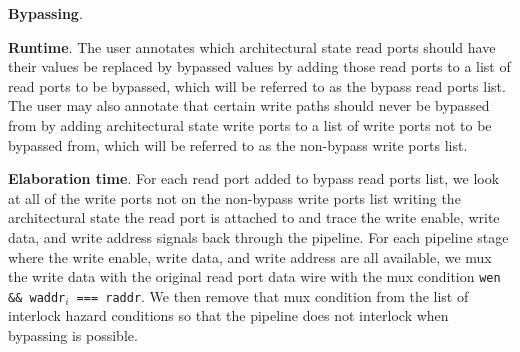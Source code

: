 {\bf Bypassing}. 

{\bf Runtime}. The user annotates which architectural state read ports
should have their values be replaced by bypassed values by adding
those read ports to a list of read ports to be bypassed, which will be
referred to as the bypass read ports list. The user may also annotate
that certain write paths should never be bypassed from by adding
architectural state write ports to a list of write ports not to be
bypassed from, which will be referred to as the non-bypass write ports
list.

{\bf Elaboration time}. For each read port added to bypass read ports
list, we look at all of the write ports not on the non-bypass write
ports list writing the architectural state the read port is attached
to and trace the write enable, write data, and write address signals
back through the pipeline. For each pipeline stage where the write
enable, write data, and write address are all available, we mux the
write data with the original read port data wire with the mux
condition {\tt wen \&\& waddr$_i$ === raddr}. We then remove that mux
condition from the list of interlock hazard conditions so that the
pipeline does not interlock when bypassing is possible.

